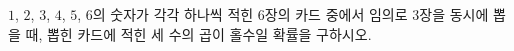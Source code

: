 $1$, $2$, $3$, $4$, $5$, $6$의 숫자가 각각 하나씩 적힌 $6$장의 카드 중에서 임의로 $3$장을 동시에 뽑을 때, 뽑힌 카드에 적힌 세 수의 곱이 홀수일 확률을 구하시오.
